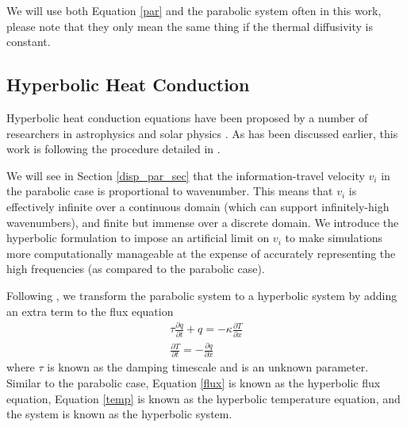 \documentclass[iop]{emulateapj}
\begin{document}
			We will use both Equation \ref{par} and the parabolic system often in this work, please note that they only mean the same thing if the thermal diffusivity is constant.
		
		\subsection{Hyperbolic Heat Conduction} \label{hyp_back_sec}
		
			Hyperbolic heat conduction equations have been proposed by a number of researchers in astrophysics \citep{snodin_06} and solar physics .
				As has been discussed earlier, this work is following the procedure detailed in .
		
			We will see in Section \ref{disp_par_sec} that the information-travel velocity $v_i$ in the parabolic case is proportional to wavenumber. 
				This means that $v_i$ is effectively infinite over a continuous domain (which can support infinitely-high wavenumbers), and finite but immense over a discrete domain.
				We introduce the hyperbolic formulation to impose an artificial limit on $v_i$ to make simulations more computationally manageable at the expense of accurately representing the high frequencies (as compared to the parabolic case).
				
			Following , we transform the parabolic system to a hyperbolic system by adding an extra term to the flux equation
				\begin{gather}
					\tau \frac{\partial q}{\partial t} + q = -\kappa \frac{\partial T}{\partial x} \label{flux}\\
					\frac{\partial T}{\partial t} = -\frac{\partial q}{\partial x} \label{temp}
				\end{gather}
				where $\tau$ is known as the damping timescale and is an unknown parameter. 
				Similar to the parabolic case, Equation \ref{flux} is known as the hyperbolic flux equation, Equation \ref{temp} is known as the hyperbolic temperature equation, and the system is known as the hyperbolic system.
				
\end{document}
